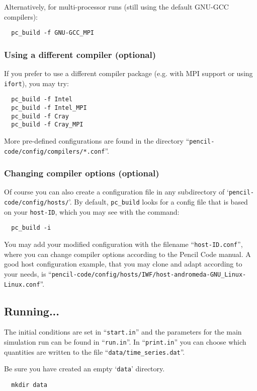 \documentclass[a4paper,12pt]{article}
\newcommand{\command}[1]{\texttt{#1}}
\newcommand{\file}[1]{``\texttt{#1}''}
\newcommand{\directory}[1]{`\texttt{#1}'}
\newcommand{\name}[1]{\textsc{#1}}
\newcommand{\code}[1]{\texttt{#1}}
\begin{document}
Alternatively, for multi-processor runs (still using the default \name{GNU-GCC} compilers):
\begin{verbatim}
  pc_build -f GNU-GCC_MPI
\end{verbatim}

\subsubsection{Using a different compiler (optional)}

If you prefer to use a different compiler package (e.g. with \name{MPI} support or using \command{ifort}), you may try:

\begin{verbatim}
  pc_build -f Intel
  pc_build -f Intel_MPI
  pc_build -f Cray
  pc_build -f Cray_MPI
\end{verbatim}

More pre-defined configurations are found in the directory \file{pencil-code/config/compilers/*.conf}.

\subsubsection{Changing compiler options (optional)}

Of course you can also create a configuration file in any subdirectory of \directory{pencil-code/config/hosts/}.
By default, \command{pc\_build} looks for a config file that is based on your \code{host-ID}, which you may see with the command:
\begin{verbatim}
  pc_build -i
\end{verbatim}
You may add your modified configuration with the filename \file{host-ID.conf}, where you can change compiler options according to the Pencil Code manual.
A good host configuration example, that you may clone and adapt according to your needs, is \file{pencil-code/config/hosts/IWF/host-andromeda-GNU\_Linux-Linux.conf}.

\subsection{Running...}

The initial conditions are set in \file{start.in} and the parameters for the main simulation run can be found in \file{run.in}.
In \file{print.in} you can choose which quantities are written to the file \file{data/time\_series.dat}.

Be sure you have created an empty \directory{data} directory.
\begin{verbatim}
  mkdir data
\end{verbatim}
\end{document}
